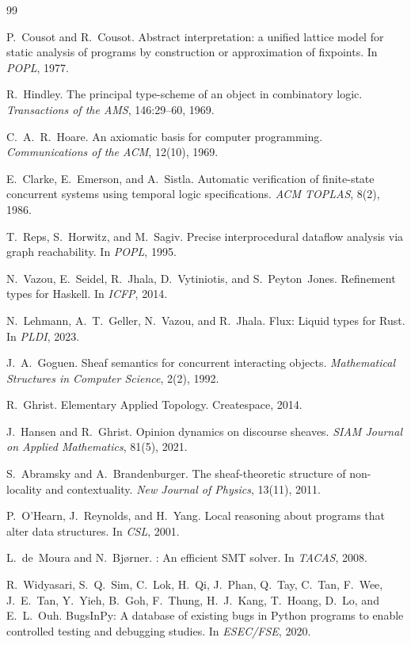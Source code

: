 \documentclass[acmsmall,screen]{acmart}
\theoremstyle{remark}
\begin{document}

\begin{thebibliography}{99}

P.~Cousot and R.~Cousot.
\newblock Abstract interpretation: a unified lattice model for static analysis
  of programs by construction or approximation of fixpoints.
\newblock In \emph{POPL}, 1977.

R.~Hindley.
\newblock The principal type-scheme of an object in combinatory logic.
\newblock \emph{Transactions of the AMS}, 146:29--60, 1969.

C.~A.~R.~Hoare.
\newblock An axiomatic basis for computer programming.
\newblock \emph{Communications of the ACM}, 12(10), 1969.

E.~Clarke, E.~Emerson, and A.~Sistla.
\newblock Automatic verification of finite-state concurrent systems using
  temporal logic specifications.
\newblock \emph{ACM TOPLAS}, 8(2), 1986.

T.~Reps, S.~Horwitz, and M.~Sagiv.
\newblock Precise interprocedural dataflow analysis via graph reachability.
\newblock In \emph{POPL}, 1995.

N.~Vazou, E.~Seidel, R.~Jhala, D.~Vytiniotis, and S.~Peyton~Jones.
\newblock Refinement types for {Haskell}.
\newblock In \emph{ICFP}, 2014.

N.~Lehmann, A.~T.~Geller, N.~Vazou, and R.~Jhala.
\newblock Flux: Liquid types for {Rust}.
\newblock In \emph{PLDI}, 2023.

J.~A.~Goguen.
\newblock Sheaf semantics for concurrent interacting objects.
\newblock \emph{Mathematical Structures in Computer Science}, 2(2), 1992.

R.~Ghrist.
\newblock Elementary Applied Topology.
\newblock Createspace, 2014.

J.~Hansen and R.~Ghrist.
\newblock Opinion dynamics on discourse sheaves.
\newblock \emph{SIAM Journal on Applied Mathematics}, 81(5), 2021.

S.~Abramsky and A.~Brandenburger.
\newblock The sheaf-theoretic structure of non-locality and contextuality.
\newblock \emph{New Journal of Physics}, 13(11), 2011.

P.~O'Hearn, J.~Reynolds, and H.~Yang.
\newblock Local reasoning about programs that alter data structures.
\newblock In \emph{CSL}, 2001.

L.~de~Moura and N.~Bj{\o}rner.
: An efficient {SMT} solver.
\newblock In \emph{TACAS}, 2008.

R.~Widyasari, S.~Q.~Sim, C.~Lok, H.~Qi, J.~Phan, Q.~Tay, C.~Tan,
  F.~Wee, J.~E.~Tan, Y.~Yieh, B.~Goh, F.~Thung, H.~J.~Kang,
  T.~Hoang, D.~Lo, and E.~L.~Ouh.
\newblock Bugs{I}n{P}y: A database of existing bugs in {Python} programs to
  enable controlled testing and debugging studies.
\newblock In \emph{ESEC/FSE}, 2020.

\end{thebibliography}
\end{document}
